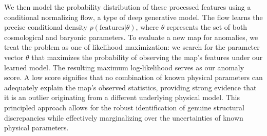 \documentclass[]{article}
\begin{document}
We then model the probability distribution of these processed features using a conditional normalizing flow, a type of deep generative model. The flow learns the precise conditional density $p(\text{features} | \theta)$, where $\theta$ represents the set of both cosmological and baryonic parameters. To evaluate a new map for anomalies, we treat the problem as one of likelihood maximization: we search for the parameter vector $\theta$ that maximizes the probability of observing the map's features under our learned model. The resulting maximum log-likelihood serves as our anomaly score. A low score signifies that no combination of known physical parameters can adequately explain the map's observed statistics, providing strong evidence that it is an outlier originating from a different underlying physical model. This principled approach allows for the robust identification of genuine structural discrepancies while effectively marginalizing over the uncertainties of known physical parameters.
\end{document}
